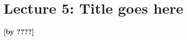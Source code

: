 
\section{Lecture 5: Title goes here}\label{sec:lecture5}
\begin{flushright}\textbf{[by ????]}\end{flushright}

